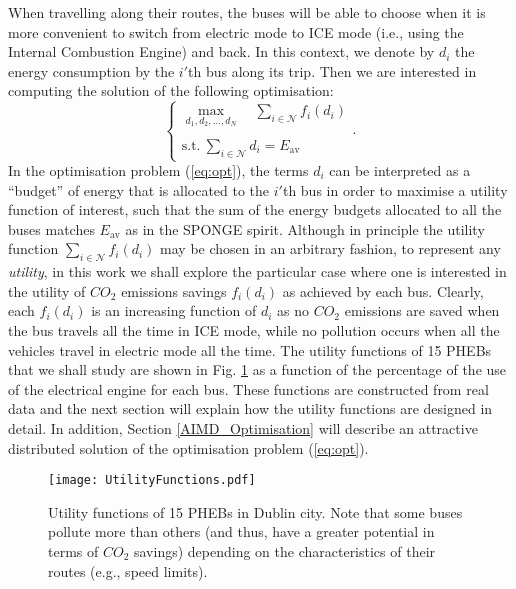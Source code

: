 \documentclass[journal]{IEEEtran}
\begin{document}
When travelling along their routes, the buses will be able to choose when it is more convenient to switch from electric mode to ICE mode (i.e., using the Internal Combustion Engine) and back. In this context, we denote by $d_i$ the energy consumption by the $i'$th bus along its trip. Then we are interested in computing the solution of the following optimisation:
\begin{equation} 
\label{eq:opt}
\left\{
\begin {array}{l}
\underset{d_1,d_2,\ldots,d_{N}}{\max} \quad
\sum\limits_{i \in \mathcal{N}} f_{i}\left(d_i \right)\\
\\
{\text{s.t.}} ~
\sum\limits_{i\in \mathcal{N}} d_i = E_{\textrm{av}}\end{array}\right..
\end{equation}
In the optimisation problem (\ref{eq:opt}), the terms $d_i$ can be interpreted as a ``budget'' of energy that is allocated to the $i'$th bus in order to maximise a utility function of interest, such that the sum of the energy budgets allocated to all the buses matches $E_{\textrm{av}}$ as in the SPONGE spirit. Although in principle the utility function $\sum\limits_{i \in \mathcal{N}} f_{i}\left(d_i \right)$ may be chosen in an arbitrary fashion, to represent any {\em utility}, in this work we shall explore the particular case where one is interested in the utility of $CO_2$ emissions savings $f_{i}\left(d_i \right)$ as achieved by each bus. Clearly, each $f_{i}\left(d_i \right)$ is an increasing function of $d_i$ as no $CO_2$ emissions are saved when the bus travels all the time in ICE mode, while no pollution occurs when all the vehicles travel in electric mode all the time. The utility functions of 15 PHEBs that we shall study are shown in Fig. \ref{UtilityFunctions} as a function of the percentage of the use of the electrical engine for each bus. These functions are constructed from real data and the next section will explain how the utility functions are designed in detail. In addition, Section \ref{AIMD_Optimisation} will describe an attractive distributed solution of the optimisation problem (\ref{eq:opt}).
\begin{figure}[htbp]
	\begin{center}
		{\texttt{[image: UtilityFunctions.pdf]}}
		\caption{Utility functions of 15 PHEBs in Dublin city. Note that some buses pollute more than others (and thus, have a greater potential in terms of $CO_2$ savings) depending on the characteristics of their routes (e.g., speed limits).}
		\label{UtilityFunctions}
	\end{center}
\end{figure}
\end{document}
